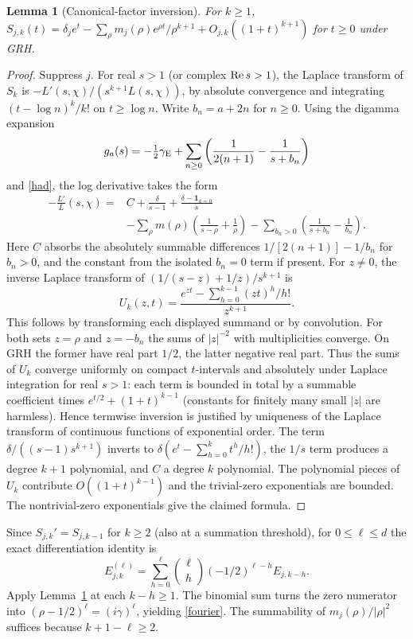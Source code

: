 \documentclass[11pt]{article}
\newtheorem{lemma}[theorem]{Lemma}
\theoremstyle{remark}\newtheorem{remark}[theorem]{Remark}
\begin{document}
\begin{lemma}[Canonical-factor inversion]\label{explicit}
For $k\ge1$, $S_{j,k}(t)=\delta_j e^t-\sum_\rho m_j(\rho)e^{\rho t}/\rho^{k+1}+O_{j,k}((1+t)^{k+1})$ for $t\ge0$ under GRH.
\end{lemma}
\begin{proof}
Suppress $j$. For real $s>1$ (or complex $\operatorname{Re} s>1$), the Laplace transform of $S_k$ is $-L'(s,\chi)/(s^{k+1}L(s,\chi))$, by absolute convergence and integrating $(t-\log n)^k/k!$ on $t\ge\log n$. Write $b_n=a+2n$ for $n\ge0$. Using the digamma expansion
\[
 g_a(s)=-\tfrac12\gamma_{\rm E}+\sum_{n\ge0}\left(\frac{1}{2(n+1)}-\frac{1}{s+b_n}\right)
\]
and \eqref{had}, the log derivative takes the form
\begin{align*}
 -\frac{L'}{L}(s,\chi)={}&C+\frac{\delta}{s-1}+\frac{\delta-\mathbf 1_{a=0}}s\\
 &-\sum_\rho m(\rho)\left(\frac1{s-\rho}+\frac1\rho\right)
 -\sum_{b_n>0}\left(\frac1{s+b_n}-\frac1{b_n}\right).
\end{align*}
Here $C$ absorbs the absolutely summable differences $1/[2(n+1)]-1/b_n$ for $b_n>0$, and the constant from the isolated $b_n=0$ term if present. For $z\ne0$, the inverse Laplace transform of $(1/(s-z)+1/z)/s^{k+1}$ is
\[
 U_k(z,t)=\frac{e^{zt}-\sum_{h=0}^{k-1}(zt)^h/h!}{z^{k+1}}.
\]
This follows by transforming each displayed summand or by convolution. For both sets $z=\rho$ and $z=-b_n$ the sums of $|z|^{-2}$ with multiplicities converge. On GRH the former have real part $1/2$, the latter negative real part. Thus the sums of $U_k$ converge uniformly on compact $t$-intervals and absolutely under Laplace integration for real $s>1$: each term is bounded in total by a summable coefficient times $e^{t/2}+(1+t)^{k-1}$ (constants for finitely many small $|z|$ are harmless). Hence termwise inversion is justified by uniqueness of the Laplace transform of continuous functions of exponential order. The term $\delta/((s-1)s^{k+1})$ inverts to $\delta(e^t-\sum_{h=0}^{k}t^h/h!)$, the $1/s$ term produces a degree $k+1$ polynomial, and $C$ a degree $k$ polynomial. The polynomial pieces of $U_k$ contribute $O((1+t)^{k-1})$ and the trivial-zero exponentials are bounded. The nontrivial-zero exponentials give the claimed formula.
\end{proof}
Since $S_{j,k}'=S_{j,k-1}$ for $k\ge2$ (also at a summation threshold), for $0\le\ell\le d$ the exact differentiation identity is
\[
 E_{j,k}^{(\ell)}=\sum_{h=0}^{\ell}\binom{\ell}{h}(-1/2)^{\ell-h}E_{j,k-h}.
\]
Apply Lemma~\ref{explicit} at each $k-h\ge1$. The binomial sum turns the zero numerator into $(\rho-1/2)^\ell=(i\gamma)^\ell$, yielding \eqref{fourier}. The summability of $m_j(\rho)/|\rho|^2$ suffices because $k+1-\ell\ge2$.
\end{document}
